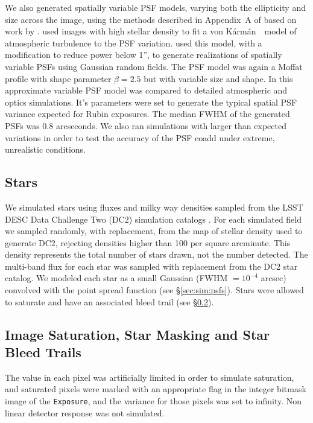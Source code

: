\documentclass[twocolumn,twocolappendix,astrosym]{openjournal}
\newcommand{\calexp}{\texttt{Exposure}}
\newcommand{\vonkarman}{{von K\'arm\'an}~}
\begin{document}
We also generated spatially variable PSF models, varying both the ellipticity
and size across the image, using the methods described in Appendix~A of
\citet{mdet20} based on work by \citet{heymans2012}.  \citet{heymans2012} used
images with high stellar density to fit a \vonkarman\ model of atmospheric
turbulence to the PSF variation. \citet{mdet20} used this model, with a
modification to reduce power below 1'', to generate realizations of spatially
variable PSFs using Gaussian random fields. The PSF model was again a Moffat
profile with shape parameter $\beta=2.5$ but with variable size and shape. In
\citet{mdet20} this approximate variable PSF model was compared to detailed
atmospheric and optics simulations.  It's parameters were set to generate the
typical spatial PSF variance expected for Rubin exposures.  The median
FWHM of the generated PSFs was 0.8 arcseconds.  We also ran simulations with
larger than expected variations in order to test the accuracy of the PSF coadd
under extreme, unrealistic conditions.

\subsection{Stars} \label{sec:sim:stars}

We simulated stars using fluxes and milky way densities sampled from the LSST
DESC Data Challenge Two (DC2) simulation catalogs \citep{DC2Abolfathi2021}.
For each simulated field we sampled randomly, with replacement, from the map of
stellar density used to generate DC2, rejecting densities higher than 100 per
square arcminute.  This density represents the total number of stars drawn, not
the number detected.  The multi-band flux for each star was sampled with
replacement from the DC2 star catalog.  We modeled each star as a small
Gaussian (FWHM $= 10^{-4}$ arcsec) convolved with the point spread function
(see \S \ref{sec:sim:psfs}).  Stars were allowed to saturate and have an
associated bleed trail (see \S \ref{sec:sim:satbleeds}).

\subsection{Image Saturation, Star Masking and Star Bleed Trails} \label{sec:sim:satbleeds}

The value in each pixel was artificially limited in order to simulate
saturation, and saturated pixels were marked with an appropriate flag in the
integer bitmask image of the \calexp, and the variance for those
pixels was set to infinity.  Non linear detector response was not simulated.
\end{document}
